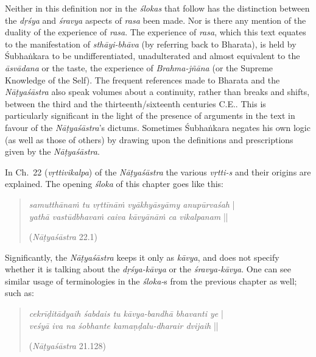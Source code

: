 Neither in this definition nor in the \textsl{ślokas} that follow has the distinction between the \textsl{dṛśya} and \textsl{śravya} aspects of \textsl{rasa} been made. Nor is there any mention of the duality of the experience of \textsl{rasa}. The experience of \textsl{rasa}, which this text equates to the manifestation of \textsl{sthāyi-bhāva} (by referring back to Bharata), is held by Śubhaṅkara to be undifferentiated, unadulterated and almost equivalent to the \textsl{āsvādana} or the taste, the experience of \textsl{Brahma-jñāna} (or the Supreme Knowledge of the Self). The frequent references made to Bharata and the \textsl{Nāṭyaśāstra} also speak volumes about a continuity, rather than breaks and shifts, between the third and the thirteenth/sixteenth centuries C.E.. This is particularly significant in the light of the presence of arguments in the text in favour of the \textsl{Nāṭyaśāstra}’s dictums. Sometimes Śubhaṅkara negates his own logic (as well as those of others) by drawing upon the definitions and prescriptions given by the \textsl{Nāṭyaśāstra}.       

In Ch.~22 (\textsl{vṛttivikalpa}) of the \textsl{Nāṭyaśāstra} the various \textsl{vṛtti-s} and their origins are explained. The opening \textsl{śloka} of this chapter goes like this:
\begin{quote}
\textsl{samutthānaṁ tu vṛttīnāṁ vyākhyāsyāmy anupūrvaśah} |  \\
\textsl{yathā vastūdbhavaṁ caiva kāvyānāṁ ca vikalpanam} ||

\hfill(\textsl{Nāṭyaśāstra} 22.1)
\end{quote}

Significantly, the \textsl{Nāṭyaśāstra} keeps it only as \textsl{kāvya}, and does not specify whether it is talking about the \textsl{dṛśya-kāvya} or the \textsl{śravya-kāvya}. One can see similar usage of terminologies in the \textsl{śloka-}s from the previous chapter as well; such as:
\begin{quote}
\textsl{cekrīḍitādyaih śabdais tu kāvya-bandhā bhavanti ye} |\\
\textsl{veśyā iva na śobhante kamaṇḍalu-dharair dvijaih} ||

\hfill(\textsl{Nāṭyaśāstra} 21.128)
\end{quote}

